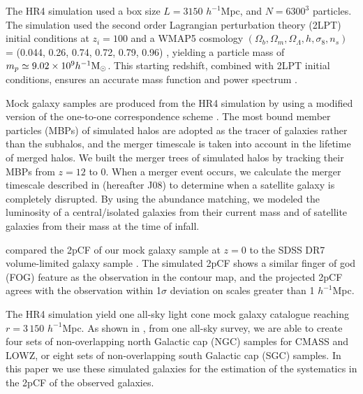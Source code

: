 \documentclass[iop]{emulateapj}
\newcommand{\hMsun}{{\ifmmode{h^{-1}{\rm
        {M_{\odot}}}}\else{$h^{-1}{\rm{M_{\odot}}}$~}\fi}}
\begin{document}
The HR4 simulation  \citep{hr4} used a box size $L={3150}$ $h^{-1}$Mpc, 
and $N=6300^3$ particles.  
The simulation used the second order Lagrangian perturbation theory (2LPT) initial conditions at $z_{i}=100$ and a WMAP5 cosmology
$(\Omega_{b},\Omega_{m},\Omega_\Lambda,h,\sigma_8,n_s)$  = (0.044, 0.26, 0.74, 0.72, 0.79, 0.96) \citep[]{komatsu 2011}, 
yielding a particle mass of $m_{p} \simeq 9.02 \times 10^9 \hMsun$.
This starting redshift, combined  with 2LPT initial conditions, ensures an accurate mass function and power spectrum \citep{2014NewA...30...79L}. 

Mock galaxy samples are produced from the HR4 simulation by using a modified version of the one-to-one correspondence scheme \citep{hong2016}. 
The most bound member particles (MBPs) of simulated halos are adopted as the tracer of galaxies rather than the subhalos,
and the merger timescale is taken into account in the lifetime of merged halos.
We built the merger trees of simulated halos by tracking their MBPs from $z = 12$ to 0.
When a merger event occurs, we calculate the merger timescale described in \cite{jiang2008} (hereafter J08)
to determine when a satellite galaxy is completely disrupted.
By using the abundance matching, 
we modeled the luminosity of a central/isolated galaxies from their current mass
and of satellite galaxies 
from their mass at the time of infall.

\cite{hong2016} compared the 2pCF of our mock galaxy sample at $z = 0$ to the SDSS DR7 volume-limited galaxy sample \citep{zehavi2011}.
The simulated 2pCF shows a similar finger of god (FOG) feature \citep{FOG} as the observation in the contour map, 
and the projected 2pCF agrees with the observation within 1$\sigma$ deviation on scales greater than 1 ${h^{-1}}$Mpc.


The HR4 simulation yield one all-sky light cone mock galaxy catalogue reaching $r=3\,150$ ${h^{-1}}$Mpc.
As shown in \cite{bossAP},
from one all-sky survey, 
we are able to create four sets of non-overlapping north Galactic cap (NGC) samples for CMASS and LOWZ, 
or eight sets of non-overlapping south Galactic cap (SGC) samples.
In this paper we use these simulated galaxies for the estimation of the systematics in the 2pCF of the observed galaxies.
\end{document}
